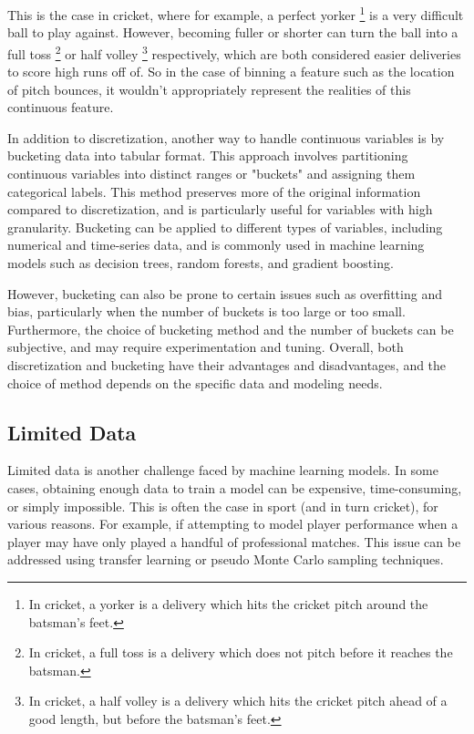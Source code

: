\documentclass[12pt,a4paper]{report}
\theoremstyle{definition}
\begin{document}
This is the case in cricket, where for example, a perfect yorker \footnote{In cricket, a yorker is a delivery which hits the cricket pitch around the batsman's feet.} is a very difficult ball to play against. 
However, becoming fuller or shorter can turn the ball into a full toss \footnote{In cricket, a full toss is a delivery which does not pitch before it reaches the batsman.} or half volley \footnote{In cricket, a half volley is a delivery which hits the cricket pitch ahead of a good length, but before the batsman's feet.} respectively, which are both considered easier deliveries to score high runs off of.
So in the case of binning a feature such as the location of pitch bounces, it wouldn't appropriately represent the realities of this continuous feature.

In addition to discretization, another way to handle continuous variables is by bucketing data into tabular format. 
This approach involves partitioning continuous variables into distinct ranges or "buckets" and assigning them categorical labels. 
This method preserves more of the original information compared to discretization, and is particularly useful for variables with high granularity. 
Bucketing can be applied to different types of variables, including numerical and time-series data, and is commonly used in machine learning models such as decision trees, random forests, and gradient boosting.

However, bucketing can also be prone to certain issues such as overfitting and bias, particularly when the number of buckets is too large or too small. 
Furthermore, the choice of bucketing method and the number of buckets can be subjective, and may require experimentation and tuning. 
Overall, both discretization and bucketing have their advantages and disadvantages, and the choice of method depends on the specific data and modeling needs.

\subsection{Limited Data}

Limited data is another challenge faced by machine learning models. 
In some cases, obtaining enough data to train a model can be expensive, time-consuming, or simply impossible. 
This is often the case in sport (and in turn cricket), for various reasons. 
For example, if attempting to model player performance when a player may have only played a handful of professional matches.
This issue can be addressed using transfer learning or pseudo Monte Carlo sampling techniques.
\end{document}
